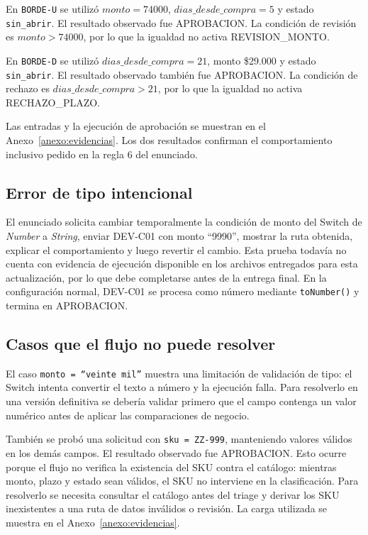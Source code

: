 \documentclass[10pt,a4paper]{article}
\begin{document}
En \texttt{BORDE-U} se utilizó $monto=74000$, $dias\_desde\_compra=5$ y estado \texttt{sin\_abrir}. El resultado observado fue APROBACION. La condición de revisión es $monto>74000$, por lo que la igualdad no activa REVISION\_MONTO.

En \texttt{BORDE-D} se utilizó $dias\_desde\_compra=21$, monto \$29.000 y estado \texttt{sin\_abrir}. El resultado observado también fue APROBACION. La condición de rechazo es $dias\_desde\_compra>21$, por lo que la igualdad no activa RECHAZO\_PLAZO.

Las entradas y la ejecución de aprobación se muestran en el Anexo~\ref{anexo:evidencias}. Los dos resultados confirman el comportamiento inclusivo pedido en la regla 6 del enunciado.

\subsection{Error de tipo intencional}

El enunciado solicita cambiar temporalmente la condición de monto del Switch de \textit{Number} a \textit{String}, enviar DEV-C01 con monto ``9990'', mostrar la ruta obtenida, explicar el comportamiento y luego revertir el cambio. Esta prueba todavía no cuenta con evidencia de ejecución disponible en los archivos entregados para esta actualización, por lo que debe completarse antes de la entrega final. En la configuración normal, DEV-C01 se procesa como número mediante \texttt{toNumber()} y termina en APROBACION.

\subsection{Casos que el flujo no puede resolver}

El caso \texttt{monto = ``veinte mil''} muestra una limitación de validación de tipo: el Switch intenta convertir el texto a número y la ejecución falla. Para resolverlo en una versión definitiva se debería validar primero que el campo contenga un valor numérico antes de aplicar las comparaciones de negocio.

También se probó una solicitud con \texttt{sku = ZZ-999}, manteniendo valores válidos en los demás campos. El resultado observado fue APROBACION. Esto ocurre porque el flujo no verifica la existencia del SKU contra el catálogo: mientras monto, plazo y estado sean válidos, el SKU no interviene en la clasificación. Para resolverlo se necesita consultar el catálogo antes del triage y derivar los SKU inexistentes a una ruta de datos inválidos o revisión. La carga utilizada se muestra en el Anexo~\ref{anexo:evidencias}.
\end{document}
